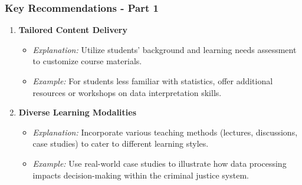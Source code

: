 \documentclass[aspectratio=169]{beamer}
\begin{document}
\begin{frame}[fragile]
    \frametitle{Key Recommendations - Part 1}
    \begin{enumerate}
        \item \textbf{Tailored Content Delivery}
            \begin{itemize}
                \item \textit{Explanation:} Utilize students' background and learning needs assessment to customize course materials.
                \item \textit{Example:} For students less familiar with statistics, offer additional resources or workshops on data interpretation skills.
            \end{itemize}
        
        \item \textbf{Diverse Learning Modalities}
            \begin{itemize}
                \item \textit{Explanation:} Incorporate various teaching methods (lectures, discussions, case studies) to cater to different learning styles.
                \item \textit{Example:} Use real-world case studies to illustrate how data processing impacts decision-making within the criminal justice system.
            \end{itemize}
    \end{enumerate}
\end{frame}
\end{document}
